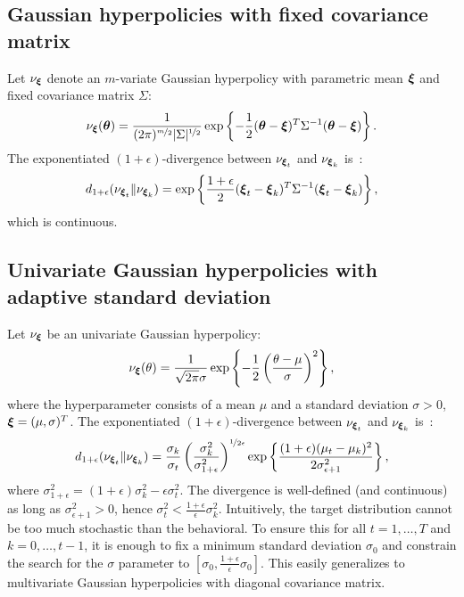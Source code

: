 \documentclass{article}
\begin{document}
\subsection{Gaussian hyperpolicies with fixed covariance matrix}
Let $\nu_{\boldsymbol{\xi}}$ denote an $m$-variate Gaussian hyperpolicy with parametric mean $\boldsymbol{\xi}$ and fixed covariance matrix $\Sigma$:
\begin{align}
	\nu_{\boldsymbol{\xi}}(\boldsymbol{\theta}) = \frac{1}{(2\pi)^{\nicefrac{m}{2}}|\Sigma|^{\nicefrac{1}{2}}}\exp\left\{
		-\frac{1}{2}(\boldsymbol{\theta}-\boldsymbol{\xi})^T\Sigma^{-1}(\boldsymbol{\theta}-\boldsymbol{\xi})
	\right\}.
\end{align}
The exponentiated $(1+\epsilon)$-\Renyi divergence between $\nu_{\boldsymbol{\xi}_t}$ and $\nu_{\boldsymbol{\xi}_k}$ is~\citep{gil2013renyi}:
\begin{align}
	d_{1+\epsilon}(\nu_{\boldsymbol{\xi}_t}\|\nu_{\boldsymbol{\xi}_k}) = \exp\left\{\frac{1+\epsilon}{2}(\boldsymbol{\xi}_t-\boldsymbol{\xi}_k)^T\Sigma^{-1}(\boldsymbol{\xi}_t-\boldsymbol{\xi}_k)\right\},
\end{align}
which is continuous.

\subsection{Univariate Gaussian hyperpolicies with adaptive standard deviation}
Let $\nu_{\boldsymbol{\xi}}$ be an univariate Gaussian hyperpolicy:
\begin{align}
	\nu_{\boldsymbol{\xi}}(\theta) = \frac{1}{\sqrt{2\pi}\sigma}\exp\left\{-\frac{1}{2}\left(\frac{\theta-\mu}{\sigma}\right)^2\right\},
\end{align}
where the hyperparameter consists of a mean $\mu$ and a standard deviation $\sigma>0$, \ie $\boldsymbol{\xi}=(\mu, \sigma)^T$.
The exponentiated $(1+\epsilon)$-\Renyi divergence between $\nu_{\boldsymbol{\xi}_t}$ and $\nu_{\boldsymbol{\xi}_k}$ is~\citep{gil2013renyi}:
\begin{align}
	d_{1+\epsilon}(\nu_{\boldsymbol{\xi}_t}\|\nu_{\boldsymbol{\xi}_k}) = \frac{\sigma_k}{\sigma_t} \left(\frac{\sigma_k^2}{\sigma_{1+\epsilon}^2}\right)^{\nicefrac{1}{2\epsilon}}\exp\left\{\frac{(1+\epsilon)(\mu_t-\mu_k)^2}{2\sigma_{\epsilon+1}^2}\right\},
\end{align}
where $\sigma_{1+\epsilon}^2 = (1+\epsilon)\sigma_k^2 - \epsilon\sigma_t^2$. The divergence is well-defined (and continuous) as long as $\sigma_{\epsilon+1}^2 > 0$, hence $\sigma_t^2<\frac{1+\epsilon}{\epsilon}\sigma_k^2$. Intuitively, the target distribution cannot be too much stochastic than the behavioral. To ensure this for all $t=1,\dots,T$ and $k=0,\dots,t-1$, it is enough to fix a minimum standard deviation $\sigma_0$ and constrain the search for the $\sigma$ parameter to $[\sigma_0, \frac{1+\epsilon}{\epsilon}\sigma_0]$. This easily generalizes to multivariate Gaussian hyperpolicies with diagonal covariance matrix.
\end{document}
